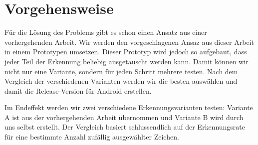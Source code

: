 \chapter{Vorgehensweise}
Für die Lösung des Problems gibt es schon einen Ansatz aus einer vorhergehenden Arbeit. Wir werden den vorgeschlagenen Ansaz aus dieser Arbeit in einem Prototypen umsetzen. Dieser Prototyp wird jedoch so aufgebaut, dass jeder Teil der Erkennung beliebig ausgetauscht werden kann. Damit können wir nicht nur eine Variante, sondern für jeden Schritt mehrere testen. Nach dem Vergleich der verschiedenen Varianten werden wir die besten auswählen und damit die Release-Version für Android erstellen.

Im Endeffekt werden wir zwei verschiedene Erkennungsvarianten testen: Variante A ist aus der vorhergehenden Arbeit übernommen und Variante B wird durch uns selbst erstellt. Der Vergleich basiert schlussendlich auf der Erkennungsrate für eine bestimmte Anzahl zufällig ausgewählter Zeichen.